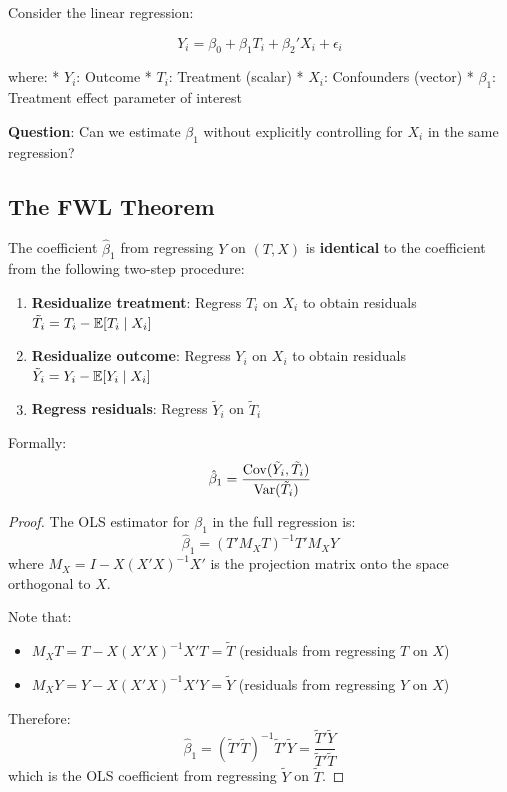 Consider the linear regression:

\[Y_i = \beta_0 + \beta_1 T_i + \beta_2' X_i + \epsilon_i\]

where: * \(Y_i\): Outcome * \(T_i\): Treatment (scalar) * \(X_i\):
Confounders (vector) * \(\beta_1\): Treatment effect parameter of
interest

\textbf{Question}: Can we estimate \(\beta_1\) without explicitly
controlling for \(X_i\) in the same regression?

\subsection{The FWL Theorem}\label{_the_fwl_theorem}

\begin{theorem}
\label{thm:fwl}
%
The coefficient $\hat{\beta}_1$ from regressing $Y$ on $(T, X)$ is \textbf{identical} to the coefficient from the following two-step procedure:
\begin{enumerate}
\item \textbf{Residualize treatment}: Regress $T_i$ on $X_i$ to obtain residuals $\tilde{T}_i = T_i - \mathbb{E}[T_i \mid X_i]$
\item \textbf{Residualize outcome}: Regress $Y_i$ on $X_i$ to obtain residuals $\tilde{Y}_i = Y_i - \mathbb{E}[Y_i \mid X_i]$
\item \textbf{Regress residuals}: Regress $\tilde{Y}_i$ on $\tilde{T}_i$
\end{enumerate}

Formally:
\[
\hat{\beta}_1 = \frac{\mathrm{Cov}(\tilde{Y}_i, \tilde{T}_i)}{\mathrm{Var}(\tilde{T}_i)}
\]
\end{theorem}

\begin{proof}
The OLS estimator for $\beta_1$ in the full regression is:
\[
\hat{\beta}_1 = (T'M_X T)^{-1} T'M_X Y
\]
where $M_X = I - X(X'X)^{-1}X'$ is the projection matrix onto the space orthogonal to $X$.

Note that:
\begin{itemize}
\item $M_X T = T - X(X'X)^{-1}X'T = \tilde{T}$ (residuals from regressing $T$ on $X$)
\item $M_X Y = Y - X(X'X)^{-1}X'Y = \tilde{Y}$ (residuals from regressing $Y$ on $X$)
\end{itemize}

Therefore:
\[
\hat{\beta}_1 = (\tilde{T}'\tilde{T})^{-1} \tilde{T}'\tilde{Y} = \frac{\tilde{T}'\tilde{Y}}{\tilde{T}'\tilde{T}}
\]
which is the OLS coefficient from regressing $\tilde{Y}$ on $\tilde{T}$.
\end{proof}

